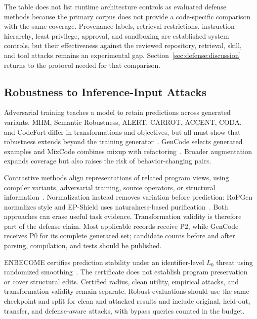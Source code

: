 \documentclass[acmsmall,screen,review]{acmart}
\begin{document}
The table does not list runtime architecture controls as evaluated defense methods because the primary corpus does not provide a code-specific comparison with the same coverage. Provenance labels, retrieval restrictions, instruction hierarchy, least privilege, approval, and sandboxing are established system controls, but their effectiveness against the reviewed repository, retrieval, skill, and tool attacks remains an experimental gap. Section~\ref{sec:defense:discussion} returns to the protocol needed for that comparison.

\subsection{Robustness to Inference-Input Attacks} \label{sec:defense:robust}
Adversarial training teaches a model to retain predictions across generated variants. MHM, Semantic Robustness, ALERT, CARROT, ACCENT, CODA, and CodeFort differ in transformations and objectives, but all must show that robustness extends beyond the training generator~\cite{zhang2020generating,ramakrishnan2022semantic,yang2022natural,zhang2022carrot,zhou2022accent,tian2023coda,zhang2024codefort}. GenCode selects generated examples and MixCode combines mixup with refactoring~\cite{gencode2024,dong2023mixcode}. Broader augmentation expands coverage but also raises the risk of behavior-changing pairs.

Contrastive methods align representations of related program views, using compiler variants, adversarial training, source operators, or structural information~\cite{jain2021contracode,jia2023clawsat,liu2023contrabert,ding2022disco}. Normalization instead removes variation before prediction: RoPGen normalizes style and EP-Shield uses naturalness-based purification~\cite{li2022ropgen,mu2025epshield}. Both approaches can erase useful task evidence. Transformation validity is therefore part of the defense claim. Most applicable records receive P2, while GenCode receives P0 for its complete generated set; candidate counts before and after parsing, compilation, and tests should be published.

ENBECOME certifies prediction stability under an identifier-level $L_0$ threat using randomized smoothing~\cite{han2026enbecome}. The certificate does not establish program preservation or cover structural edits. Certified radius, clean utility, empirical attacks, and transformation validity remain separate. Robust evaluations should use the same checkpoint and split for clean and attacked results and include original, held-out, transfer, and defense-aware attacks, with bypass queries counted in the budget.
\end{document}
